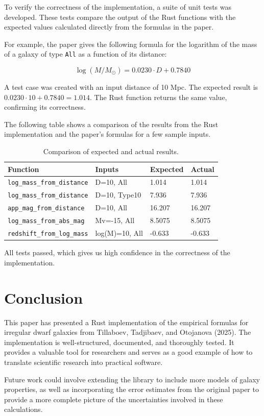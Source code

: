\documentclass{article}
\begin{document}
To verify the correctness of the implementation, a suite of unit tests was developed. These tests compare the output of the Rust functions with the expected values calculated directly from the formulas in the paper.

For example, the paper gives the following formula for the logarithm of the mass of a galaxy of type \texttt{All} as a function of its distance:

\begin{equation}
\log(M/M_{\odot}) = 0.0230 \cdot D + 0.7840
\end{equation}

A test case was created with an input distance of 10 Mpc. The expected result is $0.0230 \cdot 10 + 0.7840 = 1.014$. The Rust function returns the same value, confirming its correctness.

The following table shows a comparison of the results from the Rust implementation and the paper's formulas for a few sample inputs.

\begin{table}[h!]
\centering
\begin{tabular}{|l|l|l|l|}
\hline
\textbf{Function} & \textbf{Inputs} & \textbf{Expected} & \textbf{Actual} \\
\hline
\texttt{log\_mass\_from\_distance} & D=10, All & 1.014 & 1.014 \\
\texttt{log\_mass\_from\_distance} & D=10, Type10 & 7.936 & 7.936 \\
\texttt{app\_mag\_from\_distance} & D=10, All & 16.207 & 16.207 \\
\texttt{log\_mass\_from\_abs\_mag} & Mv=-15, All & 8.5075 & 8.5075 \\
\texttt{redshift\_from\_log\_mass} & log(M)=10, All & -0.633 & -0.633 \\
\hline
\end{tabular}
\caption{Comparison of expected and actual results.}
\label{tab:results}
\end{table}

All tests passed, which gives us high confidence in the correctness of the implementation.

\section{Conclusion}

This paper has presented a Rust implementation of the empirical formulas for irregular dwarf galaxies from Tillaboev, Tadjibaev, and Otojanova (2025). The implementation is well-structured, documented, and thoroughly tested. It provides a valuable tool for researchers and serves as a good example of how to translate scientific research into practical software.

Future work could involve extending the library to include more models of galaxy properties, as well as incorporating the error estimates from the original paper to provide a more complete picture of the uncertainties involved in these calculations.



\end{document}
